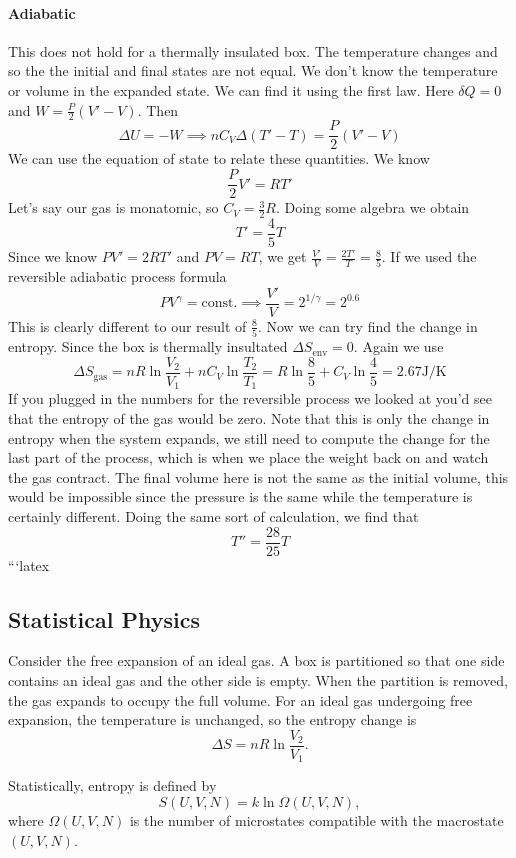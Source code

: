 \documentclass{report}
\numberwithin{equation}{section}
\begin{document}
\paragraph{Adiabatic} This does not hold for a thermally insulated box. The temperature changes and so the the initial and final states are not equal. We don't know the temperature or volume in the expanded state. We can find it using the first law. Here $\delta Q = 0$ and $W = \frac{P}{2}(V'-V)$. Then 
$$\Delta U = -W \implies nC_V\Delta (T'-T)= \frac{P}{2}(V'-V)$$
We can use the equation of state to relate these quantities. We know 
$$\frac{P}{2}V' = RT'$$
Let's say our gas is monatomic, so $C_V = \frac{3}{2}R$. Doing some algebra we obtain 
$$T' =\frac{4}{5}T$$
Since we know $PV' = 2RT'$ and $PV = RT$, we get $\frac{V'}{V} =\frac{2T'}{T} = \frac{8}{5}$. If we used the reversible adiabatic process formula 
$$PV^{\gamma} = \text{const.} \implies \frac{V'}{V}=2^{1/\gamma} = 2^{0.6}$$ 
This is clearly different to our result of $\frac{8}{5}$. Now we can try find the change in entropy. Since the box is thermally insultated
$\Delta S_{\text{env}} = 0$. Again we use 
$$\Delta S_{\text{gas}} = nR\ln\frac{V_2}{V_1}+ nC_V\ln\frac{T_2}{T_1} = R\ln\frac{8}{5} + C_V\ln\frac{4}{5} = 2.67\text{J/K}$$ 
If you plugged in the numbers for the reversible process we looked at you'd see that the entropy of the gas would be zero. Note that this is only the change in entropy when the system expands, we still need to compute the change 
for the last part of the process, which is when we place the weight back on and watch the gas contract. The final volume here is not the same as the initial volume, this would be impossible since the pressure is the same while the temperature is certainly different. Doing the same sort of calculation, we find that 
$$T'' = \frac{28}{25}T$$  
```latex
\subsection{Statistical Physics}

Consider the free expansion of an ideal gas. A box is partitioned so that one side contains an ideal gas and the other side is empty. When the partition is removed, the gas expands to occupy the full volume. For an ideal gas undergoing free expansion, the temperature is unchanged, so the entropy change is
\[
\Delta S = nR\ln\frac{V_2}{V_1}.
\]

Statistically, entropy is defined by
\[
S(U,V,N)=k\ln \Omega(U,V,N),
\]
where \(\Omega(U,V,N)\) is the number of microstates compatible with the macrostate \((U,V,N)\).
\end{document}
